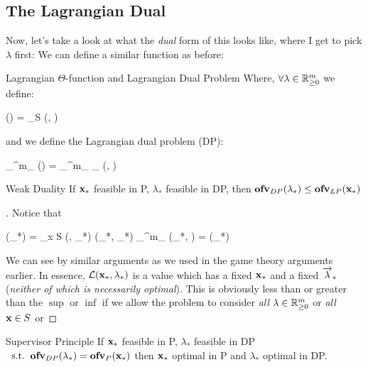 \subsection{The Lagrangian Dual}

Now, let's take a look at what the \textit{dual} form of this looks like, where I
get to pick $\lambda$ first:
We can define a similar function as before:
\begin{defn}{Lagrangian $\Theta$-function and Lagrangian Dual Problem}{}
Where, $\forall \lambda \in \mathbb{R}^m_{\geq 0}$ we define:
\begin{frml}
\Theta(\lambda) = \inf_{\vx \in S} (\vx, \lambda)
\end{frml}
and we define the Lagrangian dual problem (DP):
\begin{frml}
	\sup_{\lambda\in\reals^m_{}} \Theta(\lambda) = \sup_{\lambda \in\reals^m_{}} \inf_{\vx} (\vx, \lambda)
\end{frml}
\end{defn}

\begin{theo}{Weak Duality}{}
	If $\mathbf{x}_*$ feasible in P, $\lambda_*$ feasible in DP, then 
	$\textbf{ofv}_{DP}(\lambda_*) \leq \textbf{ofv}_{LP} (\mathbf{x}_*)$
\end{theo}

\begin{proof}[]
	Notice that
	\begin{frml}
	\Theta(\lambda_*) = \inf_{x \in S} (\vx, \lambda_*) \leq {}(\vx_*, \lambda_*)
	\leq \sup_{\lambda\in\reals^m_{}} (\vx_*, \lambda) = \Phi(\vx_*)
	\end{frml}

	We can see by similar arguments as we used in the game theory arguments earlier.
	In essence, $\mathcal{L}(\mathbf{x}_*, \lambda_*)$ is a value which has a fixed
	$\mathbf{x}_*$ and a fixed $\overrightarrow{\lambda}_*$ (\textit{neither of which is necessarily optimal}). 
	This is obviously less than or greater than
	the $\sup$ or $\inf$ if we allow the problem to consider \textit{all} $\lambda \in \mathbb{R}^m_{\geq 0}$ or
	\textit{all} $\mathbf{x} \in S$ or 
\end{proof}

\begin{theo}{Supervisor Principle}{}
	If $\mathbf{x}_*$ feasible in P, $\lambda_*$ feasible in DP
	$\;\; \text{s.t.} \;\; \textbf{ofv}_{DP}(\lambda_*) = \textbf{ofv}_{P}(\mathbf{x}_*)$ then
	$\mathbf{x}_*$ optimal in P and $\lambda_*$ optimal in DP.
\end{theo}

